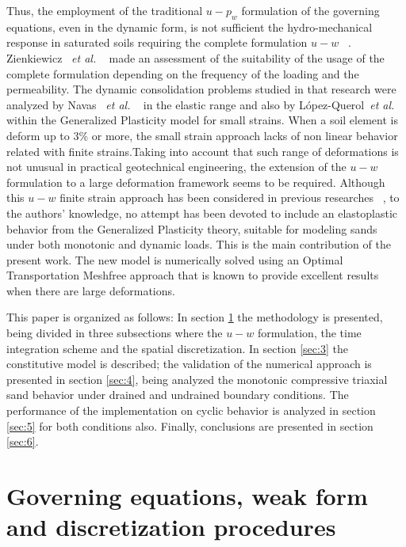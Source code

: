 \documentclass[preprint,12pt,a4paper]{elsarticle}
\begin{document}
Thus, the employment of the traditional $u-p_w$ formulation of the governing equations, even in the dynamic form, is not sufficient  the hydro-mechanical response in saturated soils requiring the complete formulation $u-w$ ~\cite{zienkiewicz1984}. Zienkiewicz ~\textit{et al.} ~\cite{zienkiewicz1980} made an assessment of the suitability of the usage of the complete formulation depending on the frequency of the loading and the permeability. The dynamic consolidation problems studied in that research were analyzed by Navas ~\textit{et al.} ~\cite{Navas2016b} in the elastic range and also by L\'opez-Querol~\textit{et al.} ~\cite{LopezQuerol2008} within the Generalized Plasticity model for small strains. When a soil element is deform up to $3\%$ or more, the small strain approach lacks of non linear behavior related with finite strains.Taking into account that such range of deformations is not unusual in practical geotechnical engineering, the extension of the $u-w$ formulation to a large deformation framework seems to be required.
Although this $u-w$ finite strain approach has been considered in previous researches ~\cite{Navas2016}, to the authors' knowledge, no attempt has been devoted to include an elastoplastic behavior from the Generalized Plasticity theory, suitable for modeling sands under both monotonic and dynamic loads. This is the main contribution of the present work. The new model is numerically solved using an Optimal Transportation Meshfree approach that is known to provide excellent results when there are large deformations.


This paper is organized as follows:  In section \ref{sec:2} the methodology is presented, being divided in three subsections where the $u-w$ formulation, the time integration scheme and the spatial discretization. In section \ref{sec:3} the constitutive model is described; the validation of the numerical approach is presented in section \ref{sec:4}, being analyzed the monotonic compressive triaxial sand behavior under drained and undrained boundary conditions. The performance of the implementation on cyclic behavior is analyzed in section \ref{sec:5} for both conditions also. Finally, conclusions are presented in section \ref{sec:6}.

\section{Governing equations, weak form and discretization procedures}\label{sec:2}
\end{document}
